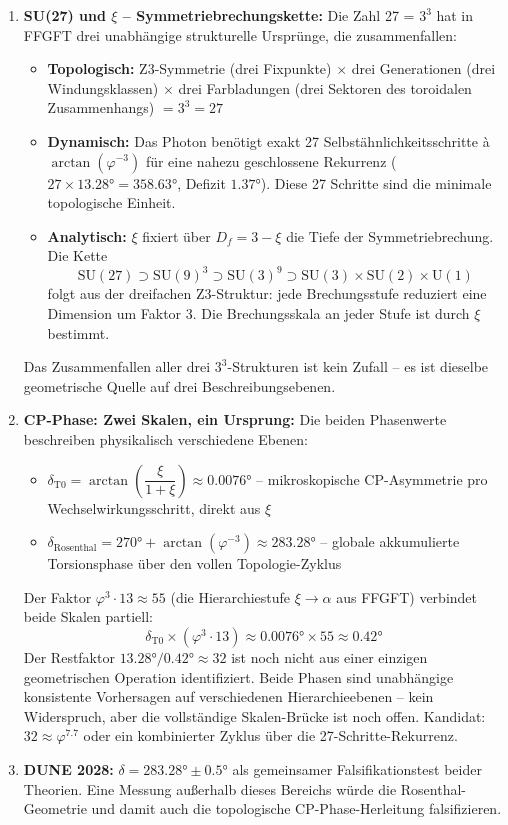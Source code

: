 \documentclass[12pt, a4paper]{article}
\newcommand{\xipar}{\xi}
\newcommand{\Dfrak}{D_f}
\begin{document}
\begin{enumerate}
  \item \textbf{SU(27) und $\xipar$ -- Symmetriebrechungskette:}
  Die Zahl 27 = $3^3$ hat in FFGFT drei unabhängige strukturelle Ursprünge, die zusammenfallen:
  \begin{itemize}[noitemsep]
    \item \textbf{Topologisch:} Z3-Symmetrie (drei Fixpunkte) $\times$ drei Generationen (drei Windungsklassen) $\times$ drei Farbladungen (drei Sektoren des toroidalen Zusammenhangs) $= 3^3 = 27$
    \item \textbf{Dynamisch:} Das Photon benötigt exakt 27 Selbstähnlichkeitsschritte à $\arctan(\varphi^{-3})$ für eine nahezu geschlossene Rekurrenz ($27 \times 13.28° = 358.63°$, Defizit $1.37°$). Diese 27 Schritte sind die minimale topologische Einheit.
    \item \textbf{Analytisch:} $\xipar$ fixiert über $\Dfrak = 3 - \xipar$ die Tiefe der Symmetriebrechung. Die Kette
    \[
      \mathrm{SU}(27) \supset \mathrm{SU}(9)^3 \supset \mathrm{SU}(3)^9 \supset \mathrm{SU}(3) \times \mathrm{SU}(2) \times \mathrm{U}(1)
    \]
    folgt aus der dreifachen Z3-Struktur: jede Brechungsstufe reduziert eine Dimension um Faktor 3. Die Brechungsskala an jeder Stufe ist durch $\xipar$ bestimmt.
  \end{itemize}
  Das Zusammenfallen aller drei $3^3$-Strukturen ist kein Zufall -- es ist dieselbe geometrische Quelle auf drei Beschreibungsebenen.

  \item \textbf{CP-Phase: Zwei Skalen, ein Ursprung:}
  Die beiden Phasenwerte beschreiben physikalisch verschiedene Ebenen:
  \begin{itemize}[noitemsep]
    \item $\delta_{\text{T0}} = \arctan\!\left(\dfrac{\xipar}{1+\xipar}\right) \approx 0.0076°$ -- mikroskopische CP-Asymmetrie pro Wechselwirkungsschritt, direkt aus $\xipar$
    \item $\delta_{\text{Rosenthal}} = 270° + \arctan(\varphi^{-3}) \approx 283.28°$ -- globale akkumulierte Torsionsphase über den vollen Topologie-Zyklus
  \end{itemize}

  Der Faktor $\varphi^3 \cdot 13 \approx 55$ (die Hierarchiestufe $\xipar \to \alpha$ aus FFGFT) verbindet beide Skalen partiell:
  \[
    \delta_{\text{T0}} \times (\varphi^3 \cdot 13) \approx 0.0076° \times 55 \approx 0.42°
  \]
  Der Restfaktor $13.28° / 0.42° \approx 32$ ist noch nicht aus einer einzigen geometrischen Operation identifiziert. Beide Phasen sind unabhängige konsistente Vorhersagen auf verschiedenen Hierarchieebenen -- kein Widerspruch, aber die vollständige Skalen-Brücke ist noch offen. Kandidat: $32 \approx \varphi^{7.7}$ oder ein kombinierter Zyklus über die 27-Schritte-Rekurrenz.

  \item \textbf{DUNE 2028:} $\delta = 283.28° \pm 0.5°$ als gemeinsamer Falsifikationstest beider Theorien. Eine Messung außerhalb dieses Bereichs würde die Rosenthal-Geometrie und damit auch die topologische CP-Phase-Herleitung falsifizieren.

\end{enumerate}
\end{document}
